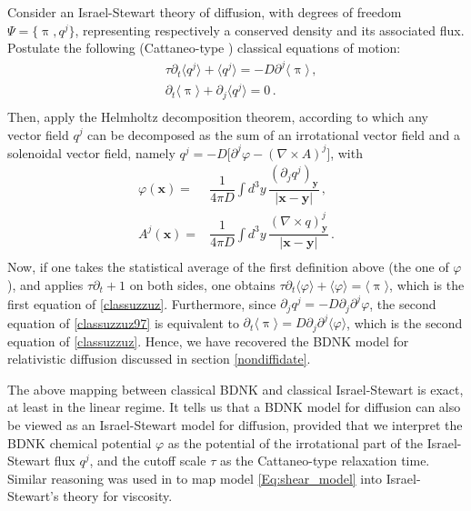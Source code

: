\documentclass[a4paper, amsfonts, amssymb, amsmath, reprint, showkeys, nofootinbib, twoside,notitlepage,onecolumn]{revtex4-2}
\theoremstyle{definition}
\begin{document}
Consider an Israel-Stewart theory \cite{Israel_Stewart_1979} of diffusion, with degrees of freedom $\Psi=\{\uppi,q^j \}$, representing respectively a conserved density and its associated flux. Postulate the following (Cattaneo-type \cite{cattaneo1958}) classical equations of motion:
\begin{equation}\label{classuzzuz97}
    \begin{split}
& \tau \partial_t \langle q^j \rangle +\langle q^j \rangle = -D \partial^j \langle \uppi \rangle \, , \\
& \partial_t \langle \uppi \rangle + \partial_j  \langle q^j \rangle=0 \, . \\
    \end{split}
\end{equation}
Then, apply the Helmholtz decomposition theorem, according to which any vector field $q^j$ can be decomposed as the sum of an irrotational vector field and a solenoidal vector field, namely $q^j=-D\big[\partial^j \varphi-(\nabla {\times} A)^j\big]$, with 
\begin{equation}\label{qqqqqqqqqqqq}
\begin{split}
 \varphi(\textbf{x}) ={}& \dfrac{1}{4\pi D}  \int d^3 y \, \dfrac{(\partial_j q^j)_{\textbf{y}}}{|\textbf{x}-\textbf{y}|} \, , \\
 A^j(\textbf{x}) ={}& \dfrac{1}{4\pi D}  \int d^3 y \, \dfrac{(\nabla {\times} q)^j_{\textbf{y}}}{|\textbf{x}-\textbf{y}|} \, . \\
\end{split}
\end{equation}
Now, if one takes the statistical average of the first definition above (the one of $\varphi$), and applies $\tau \partial_t +1$ on both sides, one obtains $\tau \partial_t \langle \varphi \rangle +\langle \varphi \rangle=\langle \uppi \rangle$, which is the first equation of \eqref{classuzzuz}. Furthermore, since $\partial_j q^j=-D\partial_j \partial^j \varphi$, the second equation of \eqref{classuzzuz97} is equivalent to $\partial_t \langle \uppi \rangle =D \partial_j \partial^j \langle \varphi \rangle$, which is the second equation of \eqref{classuzzuz}. Hence, we have recovered the BDNK model for relativistic diffusion discussed in section \ref{nondiffidate}.

The above mapping between classical BDNK and classical Israel-Stewart is exact, at least in the linear regime. It tells us that a BDNK model for diffusion can also be viewed as an Israel-Stewart model for diffusion, provided that we interpret the BDNK chemical potential $\varphi$ as the potential of the irrotational part of the Israel-Stewart flux $q^j$, and the cutoff scale $\tau$ as the Cattaneo-type relaxation time. Similar reasoning was used in \cite{Gavassino:2024ufs} to map model \eqref{Eq:shear_model} into Israel-Stewart's theory for viscosity.
\end{document}
